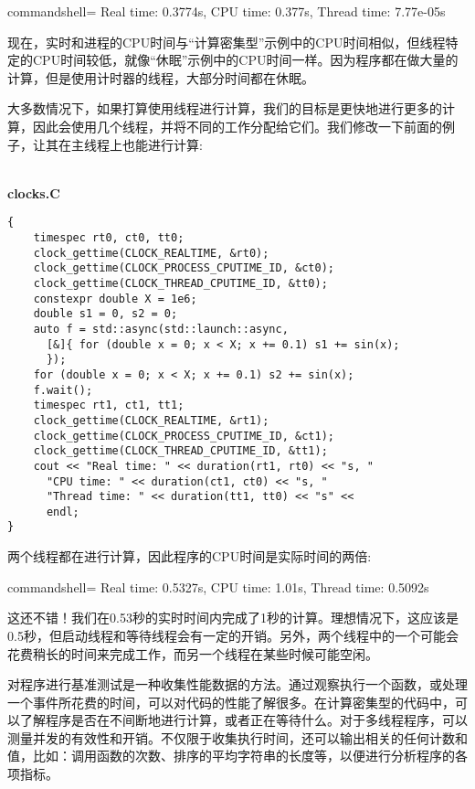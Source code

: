 \begin{tcblisting}{commandshell={}}
Real time: 0.3774s, CPU time: 0.377s, Thread time: 7.77e-05s
\end{tcblisting}

现在，实时和进程的CPU时间与“计算密集型”示例中的CPU时间相似，但线程特定的CPU时间较低，就像“休眠”示例中的CPU时间一样。因为程序都在做大量的计算，但是使用计时器的线程，大部分时间都在休眠。

大多数情况下，如果打算使用线程进行计算，我们的目标是更快地进行更多的计算，因此会使用几个线程，并将不同的工作分配给它们。我们修改一下前面的例子，让其在主线程上也能进行计算:

\hspace*{\fill} \\ %
\noindent
\textbf{clocks.C}
\begin{lstlisting}[style=styleCXX]
{
	timespec rt0, ct0, tt0;
	clock_gettime(CLOCK_REALTIME, &rt0);
	clock_gettime(CLOCK_PROCESS_CPUTIME_ID, &ct0);
	clock_gettime(CLOCK_THREAD_CPUTIME_ID, &tt0);
	constexpr double X = 1e6;
	double s1 = 0, s2 = 0;
	auto f = std::async(std::launch::async,
	  [&]{ for (double x = 0; x < X; x += 0.1) s1 += sin(x);
	  });
	for (double x = 0; x < X; x += 0.1) s2 += sin(x);
	f.wait();
	timespec rt1, ct1, tt1;
	clock_gettime(CLOCK_REALTIME, &rt1);
	clock_gettime(CLOCK_PROCESS_CPUTIME_ID, &ct1);
	clock_gettime(CLOCK_THREAD_CPUTIME_ID, &tt1);
	cout << "Real time: " << duration(rt1, rt0) << "s, "
	  "CPU time: " << duration(ct1, ct0) << "s, "
	  "Thread time: " << duration(tt1, tt0) << "s" <<
	  endl;
}
\end{lstlisting}

两个线程都在进行计算，因此程序的CPU时间是实际时间的两倍:

\begin{tcblisting}{commandshell={}}
Real time: 0.5327s, CPU time: 1.01s, Thread time: 0.5092s
\end{tcblisting}

这还不错！我们在0.53秒的实时时间内完成了1秒的计算。理想情况下，这应该是0.5秒，但启动线程和等待线程会有一定的开销。另外，两个线程中的一个可能会花费稍长的时间来完成工作，而另一个线程在某些时候可能空闲。

对程序进行基准测试是一种收集性能数据的方法。通过观察执行一个函数，或处理一个事件所花费的时间，可以对代码的性能了解很多。在计算密集型的代码中，可以了解程序是否在不间断地进行计算，或者正在等待什么。对于多线程程序，可以测量并发的有效性和开销。不仅限于收集执行时间，还可以输出相关的任何计数和值，比如：调用函数的次数、排序的平均字符串的长度等，以便进行分析程序的各项指标。

